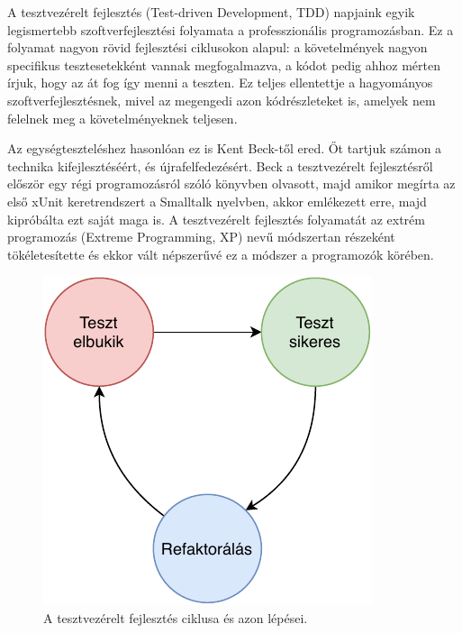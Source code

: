 
A tesztvezérelt fejlesztés (Test-driven Development, TDD) napjaink egyik legismertebb szoftverfejlesztési folyamata a professzionális programozásban. Ez a folyamat nagyon rövid fejlesztési ciklusokon alapul: a követelmények nagyon specifikus tesztesetekként vannak megfogalmazva, a kódot pedig ahhoz mérten írjuk, hogy az át fog így menni a teszten. Ez teljes ellentettje a hagyományos szoftverfejlesztésnek, mivel az megengedi azon kódrészleteket is, amelyek nem felelnek meg a követelményeknek teljesen.

Az egységteszteléshez hasonlóan ez is Kent Beck-től ered. Őt tartjuk számon a technika kifejlesztéséért, és újrafelfedezésért. Beck a tesztvezérelt fejlesztésről először egy régi programozásról szóló könyvben olvasott, majd amikor megírta az első xUnit keretrendszert a Smalltalk nyelvben, akkor emlékezett erre, majd kipróbálta ezt saját maga is. \cite{beck_2012_tdd-rediscovery} A tesztvezérelt fejlesztés folyamatát az extrém programozás (Extreme Programming, XP) nevű módszertan részeként tökéletesítette és ekkor vált népszerűvé ez a módszer a programozók körében.

\begin{figure}[h]
    \centering
    \includegraphics{images/tdd_steps.pdf}
    \caption{A tesztvezérelt fejlesztés ciklusa és azon lépései.}
    \label{fig:tdd_steps}
\end{figure}

